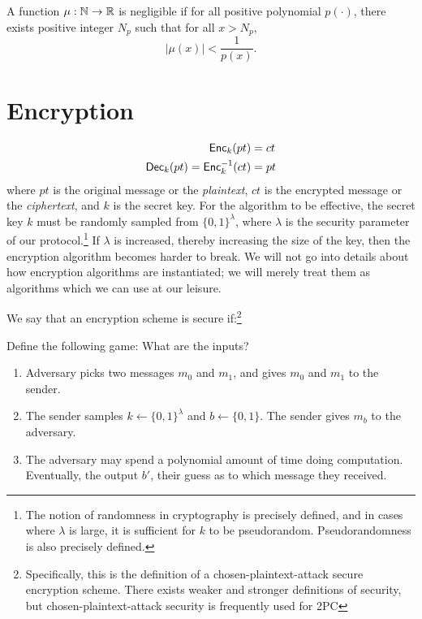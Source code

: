 \begin{definition}
\label{defn:negible}
A function $\mu : \mathbb{N} \to \mathbb{R}$ is negligible if for all positive polynomial $p(\cdot)$, there exists positive integer $N_p$ such that for all $x > N_p$, 
\begin{equation}
    |\mu(x)| < \frac{1}{p(x)}.
\end{equation}
\cite{goldreich}
\end{definition}

\section{Encryption}
\begin{equation}
    \label{eqn:encryption}
    \begin{split}
        \textsf{Enc}_k (pt) & = ct  \\
        \textsf{Dec}_k(pt) = \textsf{Enc}^{-1}_k(ct) & = pt
    \end{split}
\end{equation}
where $pt$ is the original message or the \emph{plaintext}, $ct$ is the encrypted message or the \emph{ciphertext}, and $k$ is the secret key.
For the algorithm to be effective, the secret key $k$ must be randomly sampled from $\{0,1\}^\lambda$, where $\lambda$ is the security parameter of our protocol.\footnote{The notion of randomness in cryptography is precisely defined, and in cases where $\lambda$ is large, it is sufficient for $k$ to be pseudorandom. Pseudorandomness is also precisely defined.}
If  $\lambda$ is increased, thereby increasing the size of the key, then the encryption algorithm becomes harder to break.
We will not go into details about how encryption algorithms are instantiated; we will merely treat them as algorithms which we can use at our leisure.

\begin{definition}
We say that an encryption scheme is secure if:\footnote{Specifically, this is the definition of a chosen-plaintext-attack secure encryption scheme. There exists weaker and stronger definitions of security, but chosen-plaintext-attack security is frequently used for 2PC}

Define the following game:
What are the inputs?
\begin{enumerate}
\item Adversary picks two messages $m_0$ and $m_1$, and gives $m_0$ and $m_1$ to the sender. 
\item The sender samples $k \gets \{0,1\}^{\lambda}$ and $b \gets \{0,1\}$. The sender gives $m_b$ to the adversary. 
\item The adversary may spend a polynomial amount of time doing computation. Eventually, the output $b'$, their guess as to which message they received.
\end{enumerate}
\end{definition}

